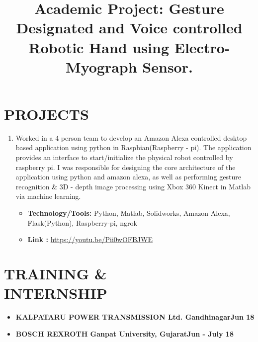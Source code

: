 \documentclass[margin]{res}
\begin{document}
\begin{resume}
    \section{PROJECTS}
    \begin{enumerate}
        \item 
    \location{}
    \title{\textbf{Academic Project: Gesture Designated and Voice controlled Robotic Hand using Electro-Myograph Sensor.}}
    \begin{position}
        Worked in a 4 person team to develop an Amazon Alexa controlled desktop based application using python in Raspbian(Raspberry - pi). The application provides an interface to start/initialize the physical robot controlled by raspberry pi. I was responsible for designing the core architecture of the application using python and amazon alexa, as well as performing gesture recognition \& 3D - depth image processing using Xbox 360 Kinect in Matlab via machine learning.
    \begin{itemize}
    \item \textbf{Technology/Tools:} Python, Matlab, Solidworks, Amazon Alexa,\\ 
    Flask(Python), Raspberry-pi, ngrok
    \item \textbf{Link :} \href{https://youtu.be/Pii0wOFBJWE}{https://youtu.be/Pii0wOFBJWE}
    \end{itemize}
    \end{position}
    \end{enumerate}
        
    \section{TRAINING \& \\INTERNSHIP}
    \begin{itemize}
        \item \textbf{\normalsize KALPATARU POWER TRANSMISSION Ltd. Gandhinagar\hfill{Jun 18}}
        \item \textbf{\normalsize BOSCH REXROTH Ganpat University, Gujarat\hfill{Jun - July 18}}
    \end{itemize}
    \end{resume}
\end{document}
